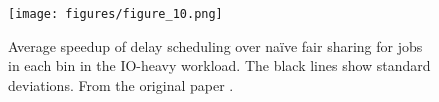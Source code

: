 \begin{figure}
  \centering
  \texttt{[image: figures/figure\_10.png]}
  \caption{Average speedup of delay scheduling over na\"{i}ve fair sharing for jobs in each bin in the IO-heavy workload. The black lines show standard deviations. From the original paper \cite{ds}.}
  \label{fig:original_10}
\end{figure}